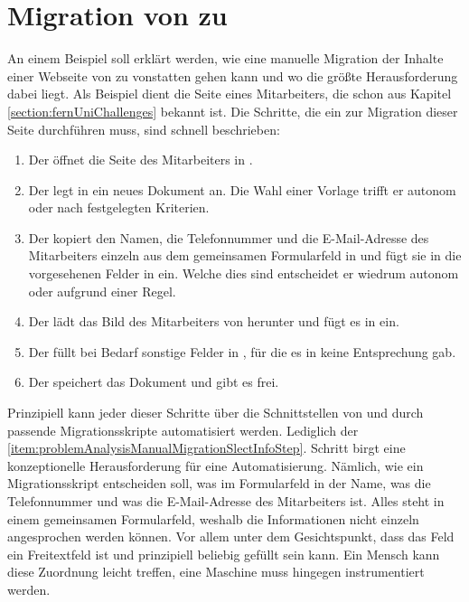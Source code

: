 \section{Migration von {\wordpress} zu {\imperia}}
    An einem Beispiel soll erklärt werden,
    wie eine manuelle Migration der Inhalte einer Webseite von {\wordpress} zu {\imperia}
    vonstatten gehen kann und wo die größte Herausforderung dabei liegt.
    Als Beispiel dient die Seite eines Mitarbeiters,
    die schon aus Kapitel \ref{section:fernUniChallenges} bekannt ist.
    Die Schritte, die ein {\editor} zur Migration dieser Seite durchführen muss,
    sind schnell beschrieben:

    \begin{enumerate}
        \item   Der {\editor} öffnet die Seite des Mitarbeiters in {\wordpress}.
        \item   Der {\editor} legt in {\imperia} ein neues Dokument an.
                Die Wahl einer Vorlage trifft er autonom oder nach festgelegten Kriterien.
        \item   \label{item:problemAnalysisManualMigrationSlectInfoStep}Der {\editor} kopiert den Namen, die Telefonnummer und die E-Mail-Adresse
                des Mitarbeiters einzeln aus dem gemeinsamen Formularfeld in {\wordpress}
                und fügt sie in die vorgesehenen Felder in {\imperia} ein.
                Welche dies sind entscheidet er wiedrum autonom oder aufgrund einer Regel.
        \item   Der {\editor} lädt das Bild des Mitarbeiters von {\wordpress} herunter
                und fügt es in {\imperia} ein.
        \item   Der {\editor} füllt bei Bedarf sonstige Felder in {\imperia},
                für die es in {\wordpress} keine Entsprechung gab.
        \item   Der {\editor} speichert das Dokument und gibt es frei.
    \end{enumerate}

    Prinzipiell kann jeder dieser Schritte über die Schnittstellen von {\wordpress}
    und {\imperia} durch passende Migrationsskripte automatisiert werden.
    Lediglich der \ref{item:problemAnalysisManualMigrationSlectInfoStep}. Schritt
    birgt eine konzeptionelle Herausforderung für eine Automatisierung.
    Nämlich, wie ein Migrationsskript entscheiden soll, was im Formularfeld in {\wordpress}
    der Name, was die Telefonnummer und was die E-Mail-Adresse des Mitarbeiters ist.
    Alles steht in einem gemeinsamen Formularfeld, weshalb die Informationen nicht
    einzeln angesprochen werden können.
    Vor allem unter dem Gesichtspunkt, dass das Feld ein Freitextfeld ist und prinzipiell beliebig gefüllt sein kann.
    Ein Mensch kann diese Zuordnung leicht treffen,
    eine Maschine muss hingegen instrumentiert werden.
